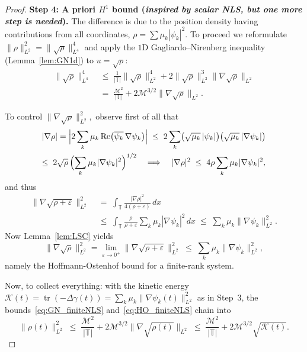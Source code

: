 \documentclass[11pt]{amsart}
\theoremstyle{definition}
\newcommand{\T}{\mathbb{T}}
\DeclareMathOperator{\tr}{tr}
\begin{document}
\begin{proof}
\smallskip

\noindent\textbf{Step 4: A priori $H^1$ bound (\emph{inspired by scalar NLS, but one more step is needed}).} The difference  is due to the position density having contributions from all coordinates, $\rho=\sum\mu_k|\psi_k|^2.$ To proceed we reformulate
 $\|\rho\|_{L^2}^2=\|\sqrt\rho\|_{L^4}^4$ and apply the $1$D Gagliardo--Nirenberg inequality (Lemma~\ref{lem:GN1d}) to $u=\sqrt\rho:$
  \begin{equation}\label{eq:GN_finiteNLS}
  \begin{aligned}
    \|\sqrt\rho\|_{L^4}^4
    &\;\le\;\frac{1}{|\T|}\|\sqrt\rho\|_{L^2}^4+2\|\sqrt\rho\|_{L^2}^3\|\nabla\sqrt\rho\|_{L^2}\\
    &\;=\;\frac{\mathcal{M}^2}{|\T|}+2\mathcal{M}^{3/2}\|\nabla\sqrt\rho\|_{L^2}.
  \end{aligned}
  \end{equation}

 To control $\|\nabla\sqrt\rho\|_{L^2}^2,$ observe first of all that
  \begin{gather*}
    |\nabla\rho|
    =\Bigl|2\sum_k\mu_k\,\mathrm{Re}\bigl(\overline{\psi_k}\,\nabla\psi_k\bigr)\Bigr|
    \;\le\; 2\sum_k\bigl(\sqrt{\mu_k}\,|\psi_k|\bigr)\bigl(\sqrt{\mu_k}\,|\nabla\psi_k|\bigr)\\
    \le\; 2\sqrt{\rho}\,\Bigl(\sum_k\mu_k|\nabla\psi_k|^2\Bigr)^{1/2}
    \quad\Longrightarrow\quad
    |\nabla\rho|^2\;\le\;4\rho\sum_k\mu_k|\nabla\psi_k|^2,
  \end{gather*}
  and thus
\[
\begin{aligned}
  \|\nabla\sqrt{\rho+\varepsilon}\|_{L^2}^2
  &\;=\;\int_\T\frac{|\nabla\rho|^2}{4(\rho+\varepsilon)}\,dx\\
  &\;\le\;\int_\T\frac{\rho}{\rho+\varepsilon}\sum_k\mu_k|\nabla\psi_k|^2\,dx
   \;\le\;\sum_k\mu_k\|\nabla\psi_k\|_{L^2}^2.
\end{aligned}
\]
Now  Lemma~\ref{lem:LSC} yields
  \begin{equation}\label{eq:HO_finiteNLS}
    \|\nabla\sqrt\rho\|_{L^2}^2=\lim\limits_{\varepsilon\to 0^+}     \|\nabla\sqrt{\rho+\varepsilon}\|_{L^2}^2\;\le\;\sum_k\mu_k\|\nabla\psi_k\|_{L^2}^2,
  \end{equation}
  namely the Hoffmann-Ostenhof bound for a finite-rank system.


\smallskip

Now, to collect everything: with the kinetic energy $\mathcal{K}(t)=\tr(-\Delta\gamma(t))=\sum_k\mu_k\|\nabla\psi_k(t)\|_{L^2}^2$ as in Step~3, the bounds~\eqref{eq:GN_finiteNLS} and~\eqref{eq:HO_finiteNLS} chain into
\begin{equation}\label{eq:rhoL2_chain_finiteNLS}
  \|\rho(t)\|_{L^2}^2
  \;\le\;\frac{\mathcal{M}^2}{|\T|}+2\mathcal{M}^{3/2}\|\nabla\sqrt{\rho(t)}\|_{L^2}
  \;\le\;\frac{\mathcal{M}^2}{|\T|}+2\mathcal{M}^{3/2}\sqrt{\mathcal{K}(t)}.
\end{equation}


\end{proof}
\end{document}

